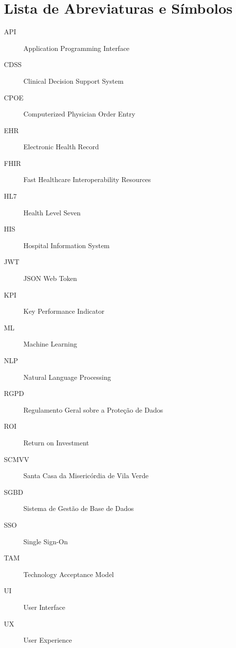 \documentclass[12pt,a4paper]{report}
\author{Diogo André da Silva Esteves}
\begin{document}
\setlength{\parindent}{0em}




\setlength{\parskip}{0pt}
\setlength{\parindent}{1.5em}




\chapter*{Lista de Abreviaturas e Símbolos}

\begin{description}
\item[API] Application Programming Interface
\item[CDSS] Clinical Decision Support System
\item[CPOE] Computerized Physician Order Entry
\item[EHR] Electronic Health Record
\item[FHIR] Fast Healthcare Interoperability Resources
\item[HL7] Health Level Seven
\item[HIS] Hospital Information System
\item[JWT] JSON Web Token
\item[KPI] Key Performance Indicator
\item[ML] Machine Learning
\item[NLP] Natural Language Processing
\item[RGPD] Regulamento Geral sobre a Proteção de Dados
\item[ROI] Return on Investment
\item[SCMVV] Santa Casa da Misericórdia de Vila Verde
\item[SGBD] Sistema de Gestão de Base de Dados
\item[SSO] Single Sign-On
\item[TAM] Technology Acceptance Model
\item[UI] User Interface
\item[UX] User Experience
\end{description}

\cleardoublepage

{}
\tableofcontents
\end{document}
